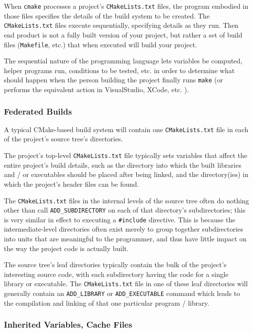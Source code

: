 \documentclass[letterpaper,10pt]{article}
\begin{document}
When \verb|cmake| processes a project's \verb|CMakeLists.txt| files, the program
embodied in those files specifies the details of the build system to be created.
The \verb|CMakeLists.txt| files execute sequentially, specifying details as they
run.  Then end product is not a fully built version of your project, but rather
a set of build files (\verb|Makefile|, etc.) that when executed will build your
project.

The sequential nature of the programming language lets variables be computed,
helper programs run, conditions to be tested, etc. in order to determine what should
happen when the person building the project finally runs \verb|make| (or performs the
equivalent action in VisualStudio, XCode, etc. ).

\subsubsection{Federated Builds}
A typical CMake-based build system will contain one \verb|CMakeLists.txt| file
in each of the project's source tree's directories.  

The project's top-level \verb|CMakeLists.txt| file typically sets variables that
affect the entire project's build details, such as the directory into which 
the built libraries and / or executables should be placed after being linked, and
the directory(ies) in which the project's header files can be found.

The \verb|CMakeLists.txt| files
in the internal levels of the source tree often do nothing other than call
\verb|ADD_SUBDIRECTORY| on each of that directory's subdirectories; this is very
similar in effect to executing a \verb|#include| directive.  This is because 
the intermediate-level directories often exist merely to group together 
subdirectories into units that are meaningful to the programmer, and thus
have little impact on the way the project code is actually built.

The source tree's leaf directories typically contain the bulk of the project's 
interesting source code, with each subdirectory having the code for a single
library or executable.  The \verb|CMakeLists.txt| file in one of these leaf
directories will generally contain an \verb|ADD_LIBRARY| or \verb|ADD_EXECUTABLE|
command which leads to the compilation and linking of that one particular
program / library.

\subsubsection{Inherited Variables, Cache Files}
\end{document}
